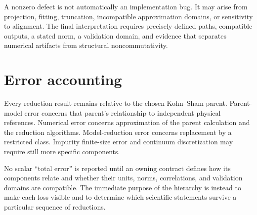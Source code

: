 A nonzero defect is not automatically an implementation bug. It may arise from
projection, fitting, truncation, incompatible approximation domains, or
sensitivity to alignment. The final interpretation requires precisely defined
paths, compatible outputs, a stated norm, a validation domain, and evidence
that separates numerical artifacts from structural noncommutativity.

\section{Error accounting}

Every reduction result remains relative to the chosen Kohn--Sham parent.
Parent-model error concerns that parent's relationship to independent physical
references. Numerical error concerns approximation of the parent calculation
and the reduction algorithms. Model-reduction error concerns replacement by a
restricted class. Impurity finite-size error and continuum discretization may
require still more specific components.

No scalar ``total error'' is reported until an owning contract defines how its
components relate and whether their units, norms, correlations, and validation
domains are compatible. The immediate purpose of the hierarchy is instead to
make each loss visible and to determine which scientific statements survive a
particular sequence of reductions.
